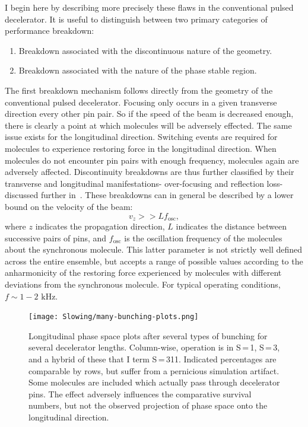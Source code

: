 I begin here by describing more precisely these flaws in the conventional pulsed decelerator.
It is useful to distinguish between two primary categories of performance breakdown:
\begin{enumerate}
\item Breakdown associated with the discontinuous nature of the geometry.
\item Breakdown associated with the nature of the phase stable region.
\end{enumerate}
The first breakdown mechanism follows directly from the geometry of the conventional pulsed decelerator. Focusing only occurs in a given transverse direction every other pin pair. So if the speed of the beam is decreased enough, there is clearly a point at which molecules will be adversely effected.
The same issue exists for the longitudinal direction. Switching events are required for molecules to experience restoring force in the longitudinal direction. When molecules do not encounter pin pairs with enough frequency, molecules again are adversely affected.
Discontinuity breakdowns are thus further classified by their transverse and longitudinal manifestations- over-focusing and reflection loss- discussed further in~\cite{Sawyer2008a}.
These breakdowns can in general be described by a lower bound on the velocity of the beam:
\begin{equation}
v_z >> Lf_\text{osc} \label{breakdownequation},
\end{equation}
where $z$ indicates the propagation direction, $L$ indicates the distance between successive pairs of pins, and $f_\text{osc}$ is the oscillation frequency of the molecules about the synchronous molecule.
This latter parameter is not strictly well defined across the entire ensemble, but accepts a range of possible values according to the anharmonicity of the restoring force experienced by molecules with different deviations from the synchronous molecule.
For typical operating conditions, $f\sim 1-2\text{ kHz}$.

\begin{figure}[t!]
\centering
\texttt{[image: Slowing/many-bunching-plots.png]}%
\caption[Phase Space for S\,=\,1, S\,=\,3, and S\,=\,311]{\label{fig:bunchingphasespace311}
Longitudinal phase space plots after several types of bunching for several decelerator lengths. Column-wise, operation is in S\,=\,1, S\,=\,3, and a hybrid of these that I term S\,=\,311. Indicated percentages are comparable by rows, but suffer from a pernicious simulation artifact. Some molecules are included which actually pass through decelerator pins. The effect adversely influences the comparative survival numbers, but not the observed projection of phase space onto the longitudinal direction.
}
\end{figure}

